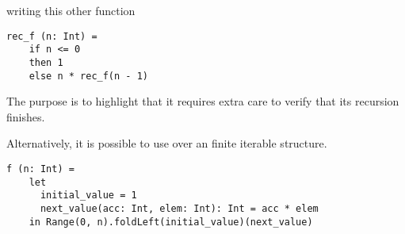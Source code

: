 writing this other function
\begin{lstlisting}[label={lst:exampleOfFactorialGoodNaming}]
  rec_f (n: Int) =
    if n <= 0
    then 1
    else n * rec_f(n - 1)
\end{lstlisting}

The purpose is to highlight that it requires extra care to verify that its recursion finishes.

Alternatively, it is possible to use  over an finite iterable structure.
\begin{lstlisting}[label={lst:exampleOfFactorialFoldLeft}]
  f (n: Int) =
    let
      initial_value = 1
      next_value(acc: Int, elem: Int): Int = acc * elem
    in Range(0, n).foldLeft(initial_value)(next_value)
\end{lstlisting}

